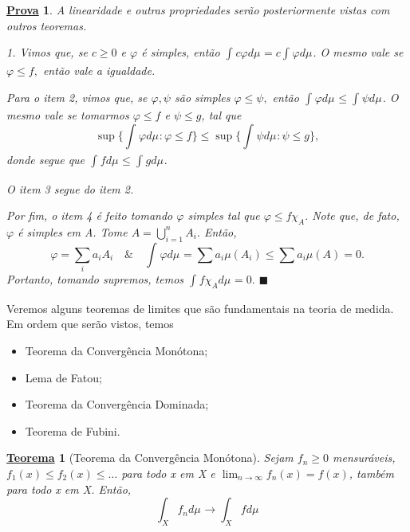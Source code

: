 \documentclass{article}
\newtheorem*{theorem*}{\underline{Teorema}}
\newtheorem*{proof*}{\underline{Prova}}
\renewcommand\qedsymbol{$\blacksquare$}
\begin{document}
\begin{proof*}
  A linearidade e outras propriedades serão posteriormente vistas com outros teoremas. 

  1. Vimos que, se \(c \geq 0\) e \(\varphi \) é simples, então \(\int_{}c \varphi  d\mu_{} = c \int_{}\varphi  d\mu_{}\). O mesmo vale se \(\varphi \leq f,\) então vale a igualdade. 

  Para o item 2, vimos que, se \(\varphi, \psi\) são simples   \(\varphi \leq \psi,\) então \(\int_{}\varphi  d\mu_{} \leq \int_{}\psi d\mu_{}\). O mesmo vale se tomarmos \(\varphi \leq f\) e \(\psi \leq g\),
  tal que 
    \[
      \sup_{}\biggl\{\int_{}\varphi  d\mu_{}: \varphi \leq f\biggr\} \leq \sup_{}\biggl\{\int_{}\psi d\mu_{}: \psi \leq g\biggr\},
    \]
  donde segue que \(\int_{}f d\mu_{} \leq \int_{}g d\mu_{}.\) 

  O item 3 segue do item 2. 

  Por fim, o item 4 é feito tomando \(\varphi \) simples tal que \(\varphi  \leq f \chi_{A}.\) Note que, de fato, \(\varphi \) é simples em A. Tome \(A = \bigcup_{i=1}^{n}A_{i}.\)
  Então,
    \[
      \varphi = \sum\limits_{i}^{}a_{i}A_{i} \quad\&\quad \int_{}\varphi  d\mu_{} = \sum\limits_{}^{}a_{i}\mu (A_{i}) \leq \sum\limits_{}^{}a_{i}\mu (A) = 0.
    \]
  Portanto, tomando supremos, temos \(\int_{}f \chi_{A} d\mu_{} = 0.\) \qedsymbol
\end{proof*}
  Veremos alguns teoremas de limites que são fundamentais na teoria de medida. Em ordem que serão vistos, temos 
 \begin{itemize}
   \item Teorema da Convergência Monótona;
   \item Lema de Fatou;
   \item Teorema da Convergência Dominada;
   \item Teorema de Fubini.
 \end{itemize}
 \hypertarget{monotone_convergence}{\begin{theorem*}[Teorema da Convergência Monótona]
   Sejam \(f_{n}\geq 0\) mensuráveis, \(f_{1}(x) \leq f_2(x) \leq \dotsc \) para todo x em X e \(\lim_{n\to \infty}f_{n}(x) = f(x)\), também para todo x em X. Então,
     \[
       \int_{X}f_{n} d\mu_{}\longrightarrow \int_{X}f d\mu_{}
     \]
  \end{theorem*}}
\end{document}
